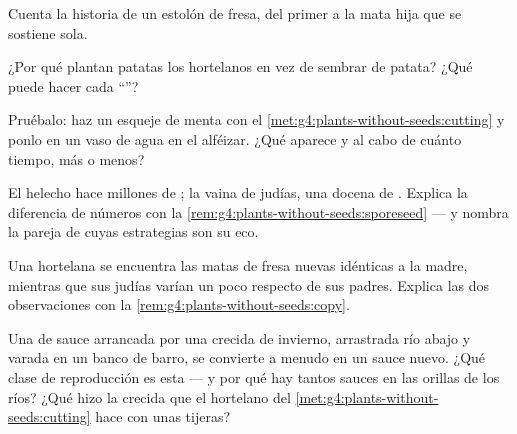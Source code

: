 \begin{exercise}[$\star$]\label{exo:g4:plants-without-seeds:6}
Cuenta la historia de un estolón de fresa, del primer  a la mata
hija que se sostiene sola.
\end{exercise}

\begin{exercise}[$\star$]\label{exo:g4:plants-without-seeds:7}
¿Por qué plantan patatas los hortelanos en vez de sembrar  de
patata? ¿Qué puede hacer cada ``''?
\end{exercise}

\begin{exercise}[$\star$]\label{exo:g4:plants-without-seeds:8}
Pruébalo: haz un esqueje de menta con el
\cref{met:g4:plants-without-seeds:cutting} y ponlo en un vaso de agua
en el alféizar. ¿Qué aparece y al cabo de cuánto tiempo, más o menos?
\end{exercise}

\begin{exercise}[$\star\star$]\label{exo:g4:plants-without-seeds:9}
El helecho hace millones de ; la vaina de judías, una docena de
. Explica la diferencia de números con la
\cref{rem:g4:plants-without-seeds:sporeseed} --- y nombra la pareja de
 cuyas estrategias son su eco.
\end{exercise}

\begin{exercise}[$\star\star$]\label{exo:g4:plants-without-seeds:10}
Una hortelana se encuentra las matas de fresa nuevas idénticas a la
madre, mientras que sus judías varían un poco respecto de sus padres.
Explica las dos observaciones con la
\cref{rem:g4:plants-without-seeds:copy}.
\end{exercise}

\begin{exercise}[$\star\star\star$]\label{exo:g4:plants-without-seeds:11}
Una  de sauce arrancada por una crecida de invierno, arrastrada
río abajo y varada en un banco de barro, se convierte a menudo en un
sauce nuevo. ¿Qué clase de reproducción es esta --- y por qué hay
tantos sauces en las orillas de los ríos? ¿Qué hizo la crecida que el
hortelano del \cref{met:g4:plants-without-seeds:cutting} hace con unas
tijeras?
\end{exercise}
